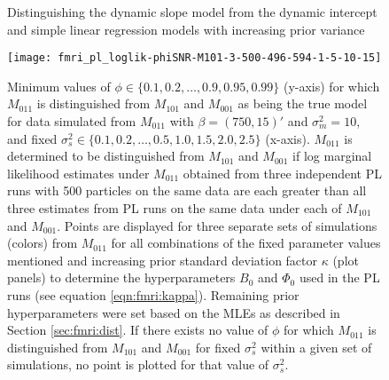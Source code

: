 
\begin{figure}
\ssp
\centering
\caption{Distinguishing the dynamic slope model from the dynamic intercept and simple linear regression models with increasing prior variance} \label{fig:fmri:kappa:M011}
\texttt{[image: fmri\_pl\_loglik-phiSNR-M101-3-500-496-594-1-5-10-15]}
\caption*{Minimum values of $\phi \in \{0.1,0.2,\ldots,0.9,0.95,0.99\}$ (y-axis) for which $M_{011}$ is distinguished from $M_{101}$ and $M_{001}$ as being the true model for data simulated from $M_{011}$ with $\beta = (750,15)'$ and $\sigma^2_m = 10$, and fixed $\sigma^2_s \in \{0.1,0.2,\ldots,0.5,1.0,1.5,2.0,2.5\}$ (x-axis). $M_{011}$ is determined to be distinguished from $M_{101}$ and $M_{001}$ if log marginal likelihood estimates under $M_{011}$ obtained from three independent PL runs with 500 particles on the same data are each greater than all three estimates from PL runs on the same data under each of $M_{101}$ and $M_{001}$. Points are displayed for three separate sets of simulations (colors) from $M_{011}$ for all combinations of the fixed parameter values mentioned and increasing prior standard deviation factor $\kappa$ (plot panels) to determine the hyperparameters $B_0$ and $\Phi_0$ used in the PL runs (see equation \eqref{eqn:fmri:kappa}). Remaining prior hyperparameters were set based on the MLEs as described in Section \ref{sec:fmri:dist}. If there exists no value of $\phi$ for which $M_{011}$ is distinguished from $M_{101}$ and $M_{001}$ for fixed $\sigma^2_s$ within a given set of simulations, no point is plotted for that value of $\sigma^2_s$.}
\end{figure}


